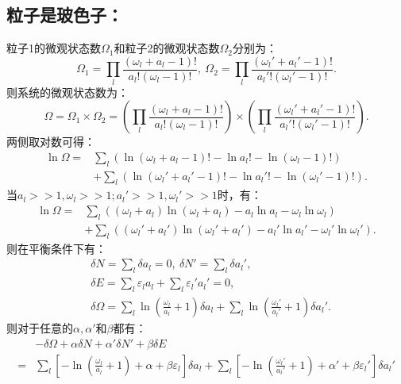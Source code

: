 \documentclass[a4paper,12pt]{article}
\begin{document}
\subsection{粒子是玻色子：}
粒子1的微观状态数$\Omega_1$和粒子2的微观状态数$\Omega_2$分别为：
\begin{equation}\nonumber
	\Omega_1 = \prod_l \frac{(\omega_l + a_l - 1)!}{a_l!(\omega_l - 1)!}, ~ \Omega_2 = \prod_l \frac{(\omega_l' + a_l' - 1)!}{a_l'!(\omega_l' - 1)!}.
\end{equation}
则系统的微观状态数为：
\begin{equation}\nonumber
	\Omega = \Omega_1 \times \Omega_2 = \left( \prod_l \frac{(\omega_l + a_l - 1)!}{a_l!(\omega_l - 1)!} \right) \times \left( \prod_l \frac{(\omega_l' + a_l' - 1)!}{a_l'!(\omega_l' - 1)!} \right). 
\end{equation}
两侧取对数可得：
\begin{equation}\nonumber
\begin{aligned}
	\ln \Omega =& \sum_l \left( \ln(\omega_l + a_l -1)! - \ln a_l! - \ln (\omega_l - 1)! \right)\\ 
	&+ \sum_l \left( \ln(\omega_l' + a_l' - 1)! - \ln a_l'! -\ln (\omega_l' - 1)! \right).
\end{aligned}
\end{equation}
当$a_l>>1,\omega_l>>1;a_l'>>1,\omega_l'>>1$时，有：
\begin{equation}\nonumber
\begin{aligned}
	\ln \Omega =& \sum_l \left( (\omega_l + a_l)\ln(\omega_l + a_l) - a_l \ln a_l - \omega_l \ln \omega_l \right) \\ 
	&+ \sum_l \left( (\omega_l' + a_l')\ln(\omega_l' + a_l') - a_l' \ln a_l' - \omega_l' \ln \omega_l' \right).
\end{aligned}
\end{equation}
则在平衡条件下有：
\begin{equation}\nonumber
\begin{aligned}
	&\delta N = \sum_l \delta a_l = 0, ~ \delta N' = \sum_l \delta a_l', \\
	&\delta E = \sum_l \varepsilon_l a_l + \sum_l \varepsilon_l' a_l' = 0, \\
	&\delta \Omega = \sum_l \ln\left( \frac{\omega_l}{a_l} + 1 \right) \delta a_l + \sum_l \ln \left( \frac{\omega_l'}{a_l'} + 1 \right) \delta a_l'.
\end{aligned}
\end{equation}
则对于任意的$\alpha,\alpha'$和$\beta$都有：
\begin{equation}\nonumber
\begin{aligned}
	&-\delta \Omega + \alpha \delta N + \alpha' \delta N' + \beta \delta E \\
	=& \sum_l \left[ -\ln \left( \frac{\omega_l}{a_l} + 1 \right) + \alpha + \beta \varepsilon_l \right] \delta a_l + \sum_l \left[ -\ln \left( \frac{\omega_l'}{a_l'} + 1 \right) + \alpha' + \beta \varepsilon_l' \right] \delta a_l'
\end{aligned}
\end{equation}
\end{document}
